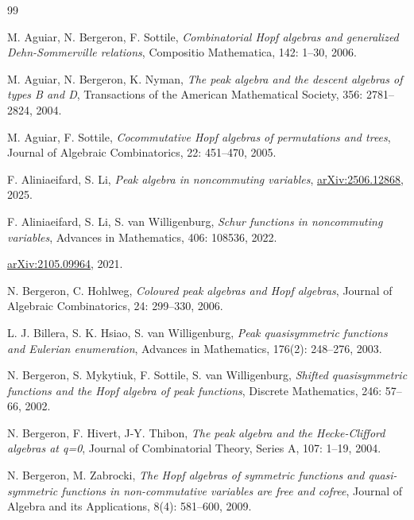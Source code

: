 \documentclass[12pt]{amsart}
\numberwithin{equation}{section}
\begin{document}
\begin{thebibliography}{99}



	 M. Aguiar, N. Bergeron, F. Sottile,
	\newblock \textit{Combinatorial Hopf algebras and generalized Dehn-Sommerville relations},
	\newblock Compositio Mathematica, 142: 1--30, 2006. 
	
	 M. Aguiar, N. Bergeron, K. Nyman,
	\newblock \textit{The peak algebra and the descent algebras of types B and D},
	\newblock Transactions of the American Mathematical Society, 356: 2781--2824, 2004.
	
	 M. Aguiar, F. Sottile,
	\newblock \textit{Cocommutative Hopf algebras of permutations and trees},
	\newblock Journal of Algebraic Combinatorics, 22: 451--470, 2005.
	
	 F. Aliniaeifard, S. Li, 
	\newblock \textit{Peak algebra in noncommuting variables},
	\newblock \href{https://arxiv.org/abs/2506.12868}{arXiv:2506.12868}, 2025.

	 F. Aliniaeifard, S. Li, S. van Willigenburg, 
	\newblock \textit{Schur functions in noncommuting variables},
	Advances in Mathematics, 406: 108536, 2022.
	
	\newblock \href{https://arxiv.org/abs/2105.09964}{arXiv:2105.09964}, 2021.

	 N. Bergeron, C. Hohlweg, 
	\newblock \textit{Coloured peak algebras and Hopf algebras},
	\newblock Journal of Algebraic Combinatorics, 24: 299--330, 2006.

	 L. J. Billera, S. K. Hsiao, S. van Willigenburg, 
	\newblock \textit{Peak quasisymmetric functions and Eulerian enumeration},
	\newblock Advances in Mathematics, 176(2): 248--276, 2003.

	 N. Bergeron, S. Mykytiuk, F. Sottile, S. van Willigenburg,
	\newblock \textit{Shifted quasisymmetric functions and the Hopf algebra of peak functions},
	\newblock Discrete Mathematics, 246: 57--66, 2002.
	
	 N. Bergeron, F. Hivert, J-Y. Thibon,
	\newblock \textit{The peak algebra and the Hecke-Clifford algebras at q=0},
	\newblock Journal of Combinatorial Theory, Series A, 107: 1--19, 2004.
	
	 N. Bergeron, M. Zabrocki, 
	\newblock \textit{The Hopf algebras of symmetric functions and quasi-symmetric functions in non-commutative variables are free and cofree},
	\newblock Journal of Algebra and its Applications, 8(4): 581--600, 2009.
	

\end{thebibliography}
\end{document}
